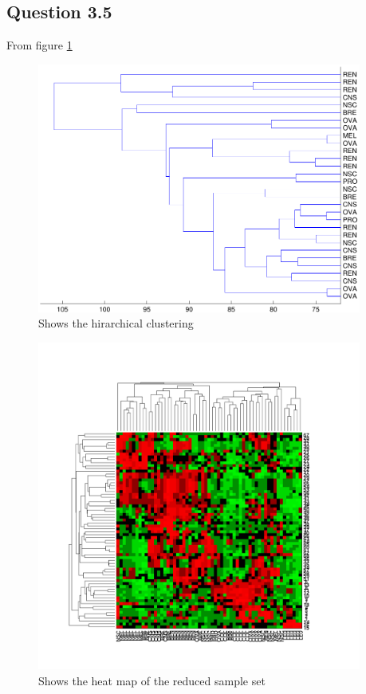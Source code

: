 \subsection*{Question 3.5}

From figure \ref{fig:q35hc} 

\begin{figure}[!htbp]
  \centering \includegraphics[width=0.95\textwidth]{./images/q35hc}
  \caption{Shows the hirarchical clustering}
  \label{fig:q35hc}
\end{figure}


\begin{figure}[!htbp]
  \centering \includegraphics[width=0.95\textwidth]{./images/q35hm}
  \caption{Shows the heat map of the reduced sample set}
  \label{fig:q35hm}
\end{figure}
